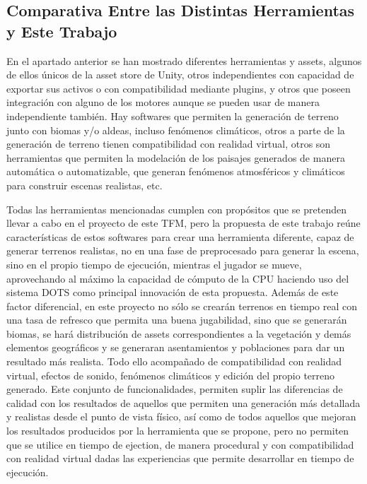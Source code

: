     \subsection{Comparativa Entre las Distintas Herramientas y Este Trabajo}

    En el apartado anterior se han mostrado diferentes herramientas y assets, algunos de ellos únicos de la asset store de Unity, otros independientes con capacidad de exportar sus activos o con compatibilidad mediante plugins, y otros que poseen integración con alguno de los motores aunque se pueden usar de manera independiente también. Hay softwares que permiten la generación de terreno junto con biomas y/o aldeas, incluso fenómenos climáticos, otros a parte de la generación de terreno tienen compatibilidad con realidad virtual, otros son herramientas que permiten la modelación de los paisajes generados de manera automática o automatizable, que generan fenómenos atmosféricos y climáticos para construir escenas realistas, etc. 

    Todas las herramientas mencionadas cumplen con propósitos que se pretenden llevar a cabo en el proyecto de este TFM, pero la propuesta de este trabajo reúne características de estos softwares para crear una herramienta diferente, capaz de generar terrenos realistas, no en una fase de preprocesado para generar la escena, sino en el propio tiempo de ejecución, mientras el jugador se mueve, aprovechando al máximo la capacidad de cómputo de la CPU haciendo uso del sistema DOTS como principal innovación de esta propuesta. Además de este factor diferencial, en este proyecto no sólo se crearán terrenos en tiempo real con una tasa de refresco que permita una buena jugabilidad, sino que se generarán biomas, se hará distribución de assets correspondientes a la vegetación y demás elementos geográficos y se generaran asentamientos y poblaciones para dar un resultado más realista. Todo ello acompañado de compatibilidad con realidad virtual, efectos de sonido, fenómenos climáticos y edición del propio terreno generado. Este conjunto de funcionalidades, permiten suplir las diferencias de calidad con los resultados de aquellos que permiten una generación más detallada y realistas desde el punto de vista físico, así como de todos aquellos que mejoran los resultados producidos por la herramienta que se propone, pero no permiten que se utilice en tiempo de ejection, de manera procedural y con compatibilidad con realidad virtual dadas las experiencias que permite desarrollar en tiempo de ejecución. 

